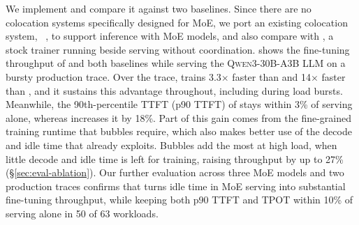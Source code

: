 We implement \sys and compare it against two baselines.
Since there are no colocation systems specifically designed for \ac{MoE}, we port an existing colocation system, \llmstation~\cite{llmstation}, to support inference with \ac{MoE} models, and also compare with \uncoord, a stock trainer running beside serving without coordination.
 shows the fine-tuning throughput of \sys and both baselines while serving the \textsc{Qwen3-30B-A3B} \ac{LLM} on a bursty production trace.
Over the trace, \sys trains 3.3$\times$ faster than \llmstation and 14$\times$ faster than \uncoord, and it sustains this advantage throughout,
including during load bursts.
Meanwhile, the 90th-percentile \acf{TTFT} (p90 \ac{TTFT}) of \sys stays within 3\% of serving alone, whereas \uncoord increases it by 18\%.
Part of this gain comes from the fine-grained training runtime that bubbles require, which also makes better use of the decode and idle time that \llmstation already exploits.
Bubbles add the most at high load, when little decode and idle time is left for training, raising throughput by up to 27\% (\S\ref{sec:eval-ablation}).
Our further evaluation across three \ac{MoE} models and two production traces confirms that \sys turns idle time in \ac{MoE} serving into substantial fine-tuning throughput, while keeping both p90 \ac{TTFT} and \ac{TPOT} within 10\% of serving alone in 50 of 63 workloads.

